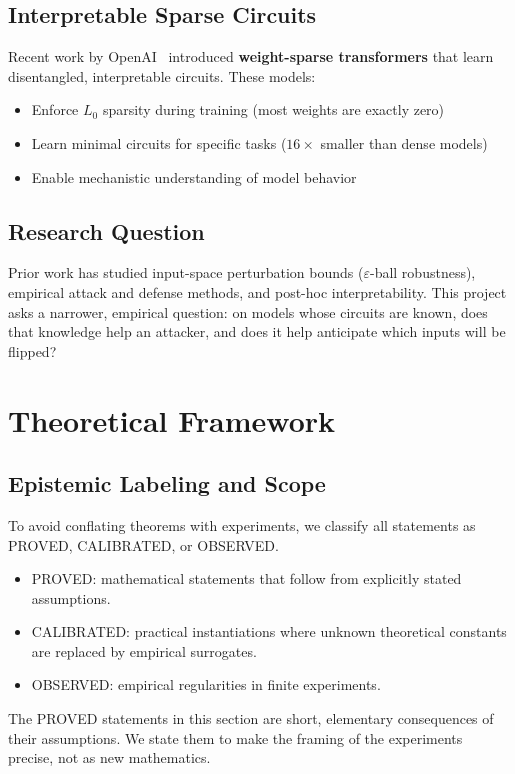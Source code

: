 \documentclass[11pt]{article}
\newcommand{\lab}[1]{{\footnotesize\MakeUppercase{#1}}}
\newcommand{\proved}{\lab{proved}}
\newcommand{\calibrated}{\lab{calibrated}}
\newcommand{\observed}{\lab{observed}}
\begin{document}
\subsection{Interpretable Sparse Circuits}
Recent work by OpenAI~\cite{gao2025} introduced \textbf{weight-sparse transformers} that learn disentangled, interpretable circuits. These models:
\begin{itemize}
  \item Enforce $L_0$ sparsity during training (most weights are exactly zero)
  \item Learn minimal circuits for specific tasks ($16\times$ smaller than dense models)
  \item Enable mechanistic understanding of model behavior
\end{itemize}

\subsection{Research Question}
Prior work has studied input-space perturbation bounds ($\varepsilon$-ball robustness), empirical attack and defense methods, and post-hoc interpretability. This project asks a narrower, empirical question: on models whose circuits are known, does that knowledge help an attacker, and does it help anticipate which inputs will be flipped?

\section{Theoretical Framework}\label{sec:theory}

\subsection{Epistemic Labeling and Scope}\label{sec:labels}
To avoid conflating theorems with experiments, we classify all statements as \proved{}, \calibrated{}, or \observed{}.
\begin{itemize}
  \item \proved{}: mathematical statements that follow from explicitly stated assumptions.
  \item \calibrated{}: practical instantiations where unknown theoretical constants are replaced by empirical surrogates.
  \item \observed{}: empirical regularities in finite experiments.
\end{itemize}
The \proved{} statements in this section are short, elementary consequences of their assumptions. We state them to make the framing of the experiments precise, not as new mathematics.
\end{document}

